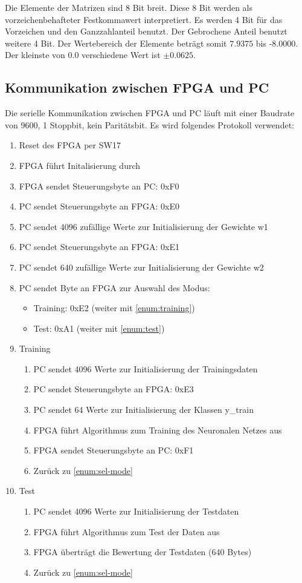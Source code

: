 \documentclass
[ 12pt,
  parskip=half %
]{scrreprt}
\begin{document}
Die Elemente der Matrizen sind 8 Bit breit. Diese 8 Bit werden als vorzeichenbehafteter Festkommawert interpretiert. Es werden 4 Bit für das Vorzeichen und den Ganzzahlanteil benutzt. Der Gebrochene Anteil benutzt weitere 4 Bit. Der Wertebereich der Elemente beträgt somit $7.9375$ bis -$8.0000$. Der kleinste von $0.0$ verschiedene Wert ist $\pm0.0625$.

\subsection{Kommunikation zwischen FPGA und PC}
\label{sec:Kommunikation-zwischen-FPGA-und-PC}

Die serielle Kommunikation zwischen FPGA und PC läuft mit einer Baudrate von 9600, 1 Stoppbit, kein Paritätsbit. Es wird folgendes Protokoll verwendet:
\begin{enumerate}
	\item Reset des FPGA per SW17
	\item FPGA führt Initalisierung durch
	\item FPGA sendet Steuerungsbyte an PC: 0xF0
	\item PC sendet Steuerungsbyte an FPGA: 0xE0
	\item PC sendet 4096 zufällige Werte zur Initialisierung der Gewichte w1
	\item PC sendet Steuerungsbyte an FPGA: 0xE1
	\item PC sendet 640 zufällige Werte zur Initialisierung der Gewichte w2
	\item \label{enum:sel-mode} PC sendet Byte an FPGA zur Auswahl des Modus: 
	\begin{itemize}
		\item Training: 0xE2 (weiter mit \ref{enum:training})
		\item Test: 0xA1 (weiter mit \ref{enum:test})
	\end{itemize}
	\item \label{enum:training} Training
	\begin{enumerate}
		\item PC sendet 4096 Werte zur Initialisierung der Trainingsdaten
		\item PC sendet Steuerungsbyte an FPGA: 0xE3
		\item PC sendet 64 Werte zur Initialisierung der Klassen y\_train
		\item FPGA führt Algorithmus zum Training des Neuronalen Netzes aus
		\item FPGA sendet Steuerungsbyte an PC: 0xF1
		\item Zurück zu \ref{enum:sel-mode}
	\end{enumerate} 
	\item \label{enum:test} Test
	\begin{enumerate}
		\item PC sendet 4096 Werte zur Initialisierung der Testdaten
		\item FPGA führt Algorithmus zum Test der Daten aus
		\item FPGA überträgt die Bewertung der Testdaten (640 Bytes)
		\item Zurück zu \ref{enum:sel-mode}
	\end{enumerate} 
\end{enumerate}
\end{document}
